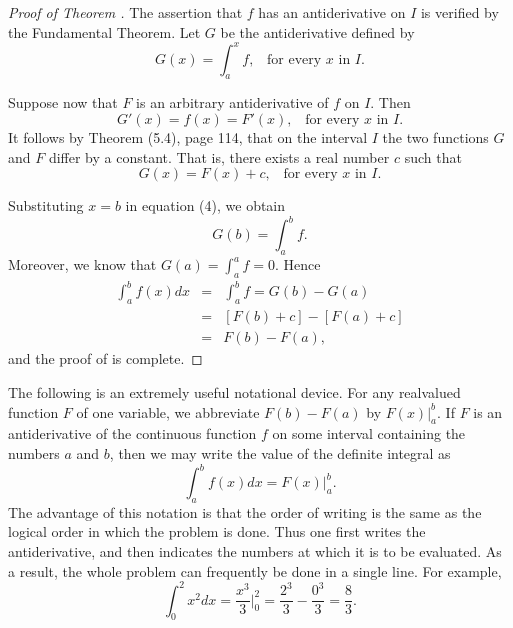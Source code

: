 \begin{proof}[Proof of Theorem ]
The assertion that $f$ has an antiderivative on $I$ is verified by the Fundamental Theorem. Let $G$ be the antiderivative defined by
\begin{equation}
G(x) = \int_{a}^{x} f,\;\;\;\mbox{for every $x$ in $I$}.   
\label{eq4.5.4}
\end{equation}

Suppose now that $F$ is an arbitrary antiderivative of $f$ on $I$. Then
$$
G'(x) = f(x) = F'(x), \;\;\;\mbox{for every $x$ in $I$}.
$$
It follows by Theorem (5.4), page 114, that on the interval $I$ the two functions $G$ and $F$ differ by a constant. That is, there exists a real number $c$ such that
$$
G(x) = F(x) + c, \;\;\;\mbox{for every $x$ in $I$}.
$$

Substituting $x = b$ in equation (4), we obtain
$$
G(b) = \int_{a}^{b} f.
$$
Moreover, we know that $G(a) =\int_{a}^{a} f = 0$. Hence
\begin{eqnarray*}
\int_{a}^{b} f(x)dx &=& \int_{a}^{b} f= G(b) - G(a) \\
                    &=& [F(b) + c] - [F(a) + c] \\
                    &=& F(b) - F(a),
\end{eqnarray*}
and the proof of  is complete.
\end{proof}

The following is an extremely useful notational device.
For any realvalued function $F$ of one variable, we abbreviate $F(b) - F(a)$ by $F(x)|_{a}^{b}$. If $F$ is an antiderivative of the continuous function $f$ on some interval containing the numbers $a$ and $b$, then we may write the value of the definite integral as
$$
\int_{a}^{b} f(x)dx = F(x) \Big|_{a}^{b} .
$$
The advantage of this notation is that the order of writing is the same as the logical order in which the problem is done. Thus one first writes the antiderivative, and then indicates the numbers at which it is to be evaluated. As a result, the whole problem can frequently be done in a single line. For example,
$$
\int_{0}^{2} x^2 dx = \frac{x^3}{3} \Big|_{0}^{2} = \frac{2^3}{3} - \frac{0^3}{3} = \frac{8}{3}.
$$

